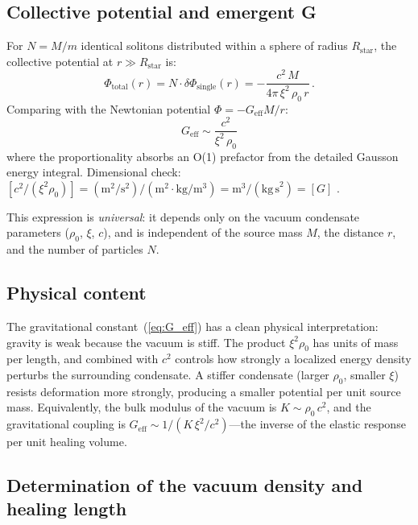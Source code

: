 \documentclass[12pt, a4paper]{article}
\newcommand{\Geff}{G_{\mathrm{eff}}}
\begin{document}
\subsection{Collective potential and emergent G}

For $N = M/m$ identical solitons distributed within a sphere of radius $R_{\mathrm{star}}$, the collective potential at $r \gg R_{\mathrm{star}}$ is:
\begin{equation}
    \Phi_{\mathrm{total}}(r) = N\cdot\delta\Phi_{\mathrm{single}}(r) = -\frac{c^2\,M}{4\pi\,\xi^2\,\rho_0\,r}\,.
\end{equation}
Comparing with the Newtonian potential $\Phi = -\Geff M/r$:
\begin{equation}
    \boxed{\;\Geff \sim \frac{c^2}{\xi^2\,\rho_0}\;}
\label{eq:G_eff}
\end{equation}
where the proportionality absorbs an O(1) prefactor from the detailed Gausson energy integral. Dimensional check: $[c^2/(\xi^2\rho_0)] = (\mathrm{m}^2/\mathrm{s}^2)/(\mathrm{m}^2\cdot\mathrm{kg}/\mathrm{m}^3) = \mathrm{m}^3/(\mathrm{kg\,s}^2) = [G]$ \checkmark.

This expression is \emph{universal}: it depends only on the vacuum condensate parameters ($\rho_0$, $\xi$, $c$), and is independent of the source mass $M$, the distance $r$, and the number of particles $N$.

\subsection{Physical content}

The gravitational constant~(\ref{eq:G_eff}) has a clean physical interpretation: gravity is weak because the vacuum is stiff. The product $\xi^2\rho_0$ has units of mass per length, and combined with $c^2$ controls how strongly a localized energy density perturbs the surrounding condensate. A stiffer condensate (larger $\rho_0$, smaller $\xi$) resists deformation more strongly, producing a smaller potential per unit source mass. Equivalently, the bulk modulus of the vacuum is $K \sim \rho_0\,c^2$, and the gravitational coupling is $\Geff \sim 1/(K\,\xi^2/c^2)$---the inverse of the elastic response per unit healing volume.

\subsection{Determination of the vacuum density and healing length}
\end{document}
